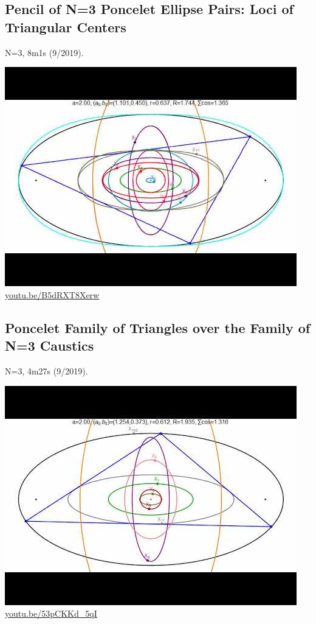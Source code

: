 \documentclass[12pt]{amsart}
\begin{document}
\subsection{Pencil of N=3 Poncelet Ellipse Pairs: Loci of Triangular Centers}
\label{vid:B5dRXT8Xerw}
\noindent N=3, 8m1s (9/2019). 
\begin{center}\includegraphics[width=.5\textwidth]{pics/B5dRXT8Xerw.jpg} \\ 
\href{https://youtu.be/B5dRXT8Xerw}{\url{youtu.be/B5dRXT8Xerw}}\end{center}
% 

\subsection{Poncelet Family of Triangles over the Family of N=3 Caustics}
\label{vid:53pCKKd_5qI}
\noindent N=3, 4m27s (9/2019). 
\begin{center}\includegraphics[width=.5\textwidth]{pics/53pCKKd_5qI.jpg} \\ 
\href{https://youtu.be/53pCKKd_5qI}{\url{youtu.be/53pCKKd\_5qI}}\end{center}
% 
\end{document}
